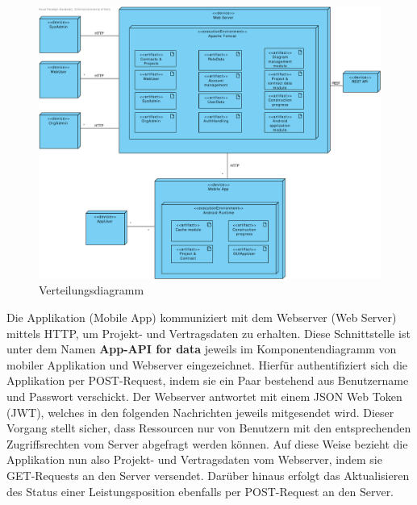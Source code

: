 \begin{figure}[h]
\centering
\includegraphics[width=\linewidth]{img/diagrams/Deployment-Diagram.pdf}
\caption{Verteilungsdiagramm}
\end{figure}
\clearpage
\noindent
Die Applikation (Mobile App) kommuniziert mit dem Webserver (Web Server) mittels HTTP,  um Projekt- und Vertragsdaten zu erhalten.  
Diese Schnittstelle ist unter dem Namen \textbf{App-API for data} jeweils im Komponentendiagramm von mobiler Applikation und Webserver eingezeichnet.
Hierf\"ur authentifiziert sich die Applikation per POST-Request,  indem sie ein Paar bestehend aus Benutzername und Passwort verschickt.  
Der Webserver antwortet mit einem JSON Web Token (JWT),  welches in den folgenden Nachrichten jeweils mitgesendet wird. 
Dieser Vorgang stellt sicher,  dass Ressourcen nur von Benutzern mit den entsprechenden Zugriffsrechten vom Server abgefragt werden k\"onnen.
Auf diese Weise bezieht die Applikation nun also Projekt- und Vertragsdaten  vom Webserver,  indem sie GET-Requests an den Server versendet.  
Dar\"uber hinaus erfolgt das Aktualisieren des Status einer Leistungsposition ebenfalls per POST-Request an den Server.








